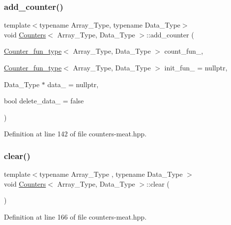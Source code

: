 \subsubsection{\texorpdfstring{add\+\_\+counter()}{add\_counter()}\hspace{0.1cm}{\footnotesize\ttfamily [3/3]}}
{\footnotesize\ttfamily template$<$typename Array\+\_\+\+Type, typename Data\+\_\+\+Type$>$ \\
void \hyperlink{class_counters}{Counters}$<$ Array\+\_\+\+Type, Data\+\_\+\+Type $>$\+::add\+\_\+counter (\begin{DoxyParamCaption}\item[{\hyperlink{typedefs_8hpp_ac0160f52f564dea3ac033b374cffbfe7}{Counter\+\_\+fun\+\_\+type}$<$ Array\+\_\+\+Type, Data\+\_\+\+Type $>$}]{count\+\_\+fun\+\_\+,  }\item[{\hyperlink{typedefs_8hpp_ac0160f52f564dea3ac033b374cffbfe7}{Counter\+\_\+fun\+\_\+type}$<$ Array\+\_\+\+Type, Data\+\_\+\+Type $>$}]{init\+\_\+fun\+\_\+ = {\ttfamily nullptr},  }\item[{Data\+\_\+\+Type $\ast$}]{data\+\_\+ = {\ttfamily nullptr},  }\item[{bool}]{delete\+\_\+data\+\_\+ = {\ttfamily false} }\end{DoxyParamCaption})\hspace{0.3cm}{\ttfamily [inline]}}



Definition at line 142 of file counters-\/meat.\+hpp.

\mbox{\label{class_counters_ae4635c154970a13ce88d2e982fe7dab3}} 
\subsubsection{\texorpdfstring{clear()}{clear()}}
{\footnotesize\ttfamily template$<$typename Array\+\_\+\+Type , typename Data\+\_\+\+Type $>$ \\
void \hyperlink{class_counters}{Counters}$<$ Array\+\_\+\+Type, Data\+\_\+\+Type $>$\+::clear (\begin{DoxyParamCaption}{ }\end{DoxyParamCaption})\hspace{0.3cm}{\ttfamily [inline]}}



Definition at line 166 of file counters-\/meat.\+hpp.

